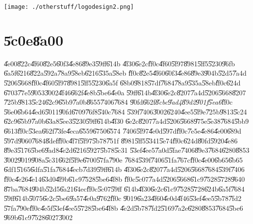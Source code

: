 \documentclass[12pt,a4paper]{article}
\begin{document}
\texttt{[image: ./otherstuff/logodesign2.png]}%

\part{\U{5c0e}\U{8a00}}

\bigskip

\U{4e00}\U{822c}\U{4f60}\U{82e5}\U{60f3}\U{4e86}\U{89e3}\U{59ff}\U{614b}%
\U{4f30}\U{6e2c}\U{ff0c}\U{4f60}\U{5f97}\U{8981}\U{5ff5}\U{5230}\U{96fb}%
\U{6a5f}\U{6216}\U{822a}\U{592a}\U{78a9}\U{58eb}\U{6216}\U{535a}\U{58eb}%
\U{ff0c}\U{82e5}\U{4f60}\U{60f3}\U{4e86}\U{89e3}\U{904b}\U{52d5}\U{7a4d}%
\U{5206}\U{5668}\U{ff0c}\U{4f60}\U{5f97}\U{8981}\U{5ff5}\U{5230}\U{6a5f}%
\U{68b0}\U{9818}\U{57df}\U{7684}\U{78a9}\U{535a}\U{58eb}\U{ff0c}\U{624d}%
\U{6703}\U{77e5}\U{9053}\U{3002}\U{4f46}\U{662f}\U{4e8b}\U{5be6}\U{4e0a}%
\U{59ff}\U{614b}\U{4f30}\U{6e2c}\U{8207}\U{7a4d}\U{5206}\U{5668}\U{8207}%
\U{725b}\U{9813}\U{5c24}\U{62c9}\U{65b9}\U{7a0b}\U{8655}\U{7406}\U{7684}%
\U{90fd}\U{662f}\emph{\U{8cbc}\U{9ad4}\U{89d2}\U{901f}\U{5ea6}}\U{ff0c}%
\U{56e0}\U{6b64}\U{4ed6}\U{5011}\U{90fd}\U{6709}\U{76f8}\U{540c}\U{7684}%
\U{539f}\U{7406}\U{3002}\U{6240}\U{4ee5}\U{5f9e}\U{725b}\U{9813}\U{5c24}%
\U{62c9}\U{65b9}\U{7a0b}\U{63a8}\U{5ee3}\U{5230}\U{59ff}\U{614b}\U{4f30}%
\U{6e2c}\U{8207}\U{7a4d}\U{5206}\U{5668}\U{975e}\U{5e38}\U{7684}\U{5bb9}%
\U{6613}\U{ff0c}\U{53ea}\U{662f}\U{73fe}\U{4eca}\U{6559}\U{6750}\U{6574}%
\U{7406}\U{5f97}\U{4e0d}\U{597d}\U{ff0c}\U{7e5e}\U{4e86}\U{4e00}\U{689d}%
\U{597d}\U{9060}\U{7684}\U{8def}\U{ff0c}\U{4f7f}\U{5f97}\U{5b78}\U{751f}%
\U{8981}\U{5ff5}\U{5341}\U{5e74}\U{ff0c}\U{624d}\U{80fd}\U{5920}\U{4e86}%
\U{89e3}\U{5176}\U{5be6}\U{9ad8}\U{4e2d}\U{6216}\U{5927}\U{5b78}\U{5c31}%
\U{53ef}\U{4ee5}\U{7a0d}\U{5fae}\U{7406}\U{89e3}\U{7684}\U{6280}\U{8853}%
\U{3002}\U{9019}\U{908a}\U{5c31}\U{662f}\U{5f9e}\U{6700}\U{57fa}\U{790e}%
\U{7684}\U{539f}\U{7406}\U{51fa}\U{767c}\U{ff0c}\U{4e00}\U{6b65}\U{6b65}%
\U{6df1}\U{5165}\U{6dfa}\U{51fa}\U{7684}\U{4ecb}\U{7d39}\U{59ff}\U{614b}%
\U{4f30}\U{6e2c}\U{8207}\U{7a4d}\U{5206}\U{5668}\U{7684}\U{539f}\U{7406}%
\U{ff0c}\U{4e26}\U{4e14}\U{63d0}\U{4f9b}\U{61c9}\U{7528}\U{5be6}\U{4f8b}%
\U{ff0c}\U{5c07}\U{7a4d}\U{5206}\U{5668}\U{61c9}\U{7528}\U{5728}\U{9640}%
\U{87ba}\U{7684}\U{904b}\U{52d5}\U{6a21}\U{64ec}\U{ff0c}\U{5c07}\U{59ff}%
\U{614b}\U{4f30}\U{6e2c}\U{61c9}\U{7528}\U{5728}\U{624b}\U{6a5f}\U{7684}%
\U{59ff}\U{614b}\U{5075}\U{6e2c}\U{5be6}\U{9a57}\U{4e0a}\U{9762}\U{ff0c}%
\U{9019}\U{6a23}\U{4f60}\U{4e0d}\U{4f46}\U{53ef}\U{4ee5}\U{5b78}\U{7fd2}%
\U{57fa}\U{790e}\U{ff0c}\U{4e5f}\U{53ef}\U{4ee5}\U{5728}\U{5be6}\U{4f8b}%
\U{4e2d}\U{5b78}\U{7fd2}\U{5169}\U{7a2e}\U{6280}\U{8853}\U{7684}\U{5be6}%
\U{969b}\U{61c9}\U{7528}\U{6027}\U{3002}
\end{document}
